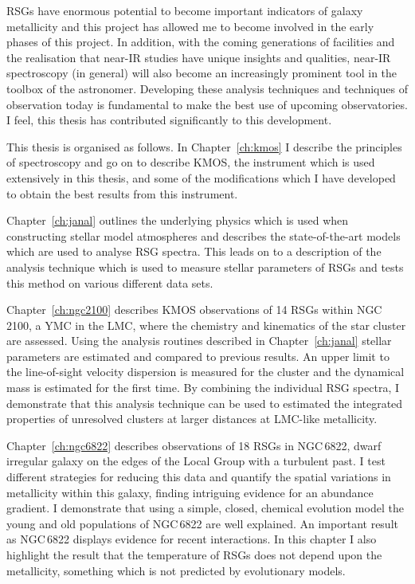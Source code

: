RSGs have enormous potential to become important indicators of galaxy metallicity and this project has allowed me to become involved in the early phases of this project.
In addition, with the coming generations of facilities and the realisation that near-IR studies have unique insights and qualities, near-IR spectroscopy (in general) will also become an increasingly prominent tool in the toolbox of the astronomer.
Developing these analysis techniques and techniques of observation today is fundamental to make the best use of upcoming observatories.
I feel, this thesis has contributed significantly to this development.

This thesis is organised as follows.
In Chapter~\ref{ch:kmos} I describe the principles of spectroscopy and go on to describe KMOS, the instrument which is used extensively in this thesis, and some of the modifications which I have developed to obtain the best results from this instrument.

Chapter~\ref{ch:janal} outlines the underlying physics which is used when constructing stellar model atmospheres and describes the state-of-the-art models which are used to analyse RSG spectra.
This leads on to a description of the analysis technique which is used to measure stellar parameters of RSGs and tests this method on various different data sets.

Chapter~\ref{ch:ngc2100} describes KMOS observations of 14 RSGs within NGC\,2100, a YMC in the LMC, where the chemistry and kinematics of the star cluster are assessed.
Using the analysis routines described in Chapter~\ref{ch:janal} stellar parameters are estimated and compared to previous results. An upper limit to the line-of-sight velocity dispersion is measured for the cluster and the dynamical mass is estimated for the first time.
By combining the individual RSG spectra, I demonstrate that this analysis technique can be used to estimated the integrated properties of unresolved clusters at larger distances at LMC-like metallicity.

Chapter~\ref{ch:ngc6822} describes observations of 18 RSGs in NGC\,6822, dwarf irregular galaxy on the edges of the Local Group with a turbulent past.
I test different strategies for reducing this data and quantify the spatial variations in metallicity within this galaxy, finding intriguing evidence for an abundance gradient.
I demonstrate that using a simple, closed, chemical evolution model the young and old populations of NGC\,6822 are well explained. An important result as NGC\,6822 displays evidence for recent interactions.
In this chapter I also highlight the result that the temperature of RSGs does not depend upon the metallicity, something which is not predicted by evolutionary models.

